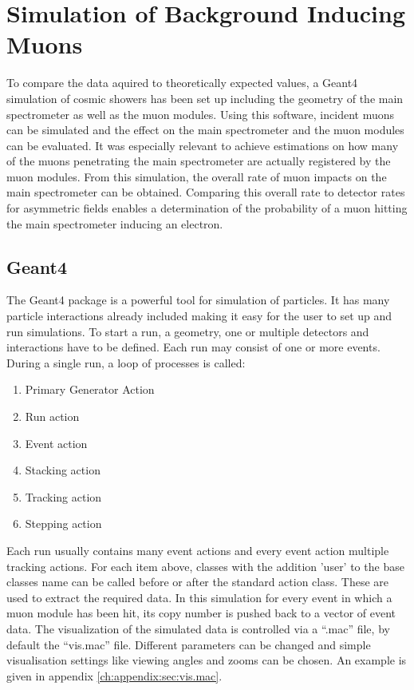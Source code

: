 
\chapter{Simulation of Background Inducing Muons}
\label{ch:Simulation of muon induced background}
  To compare the data aquired to theoretically expected values, a Geant4 \cite{geant} simulation of cosmic showers has been set up including the geometry of the main spectrometer as well as the muon modules. Using this software, incident muons can be simulated and the effect on the main spectrometer and the muon modules can be evaluated. It was especially relevant to achieve estimations on how many of the muons penetrating the main spectrometer are actually registered by the muon modules. From this simulation, the overall rate of muon impacts on the main spectrometer can be obtained. Comparing this overall rate to detector rates for asymmetric fields enables a determination of the probability of a muon hitting the main spectrometer inducing an electron.
  \section{Geant4}
  \label{ch:Simulation software:sec:Geant4}
  The Geant4 package is a powerful tool for simulation of particles. It has many particle interactions already included making it easy for the user to set up and run simulations. To start a run, a geometry, one or multiple detectors and interactions have to be defined. Each run may consist of one or more events. During a single run, a loop of processes is called:
  \begin{enumerate}
  	\item Primary Generator Action
  	\item Run action
  	\item Event action
  	\item Stacking action
  	\item Tracking action
  	\item Stepping action
  \end{enumerate}
  Each run usually contains many event actions and every event action multiple tracking actions. For each item above, classes with the addition 'user' to the base classes name can be called before or after the standard action class. These are used to extract the required data. In this simulation for every event in which a muon module has been hit, its copy number is pushed back to a vector of event data. The visualization of the simulated data is controlled via a ``.mac'' file, by default the ``vis.mac'' file. Different parameters can be changed and simple visualisation settings like viewing angles and zooms can be chosen. An example is given in appendix \ref{ch:appendix:sec:vis.mac}.
  


